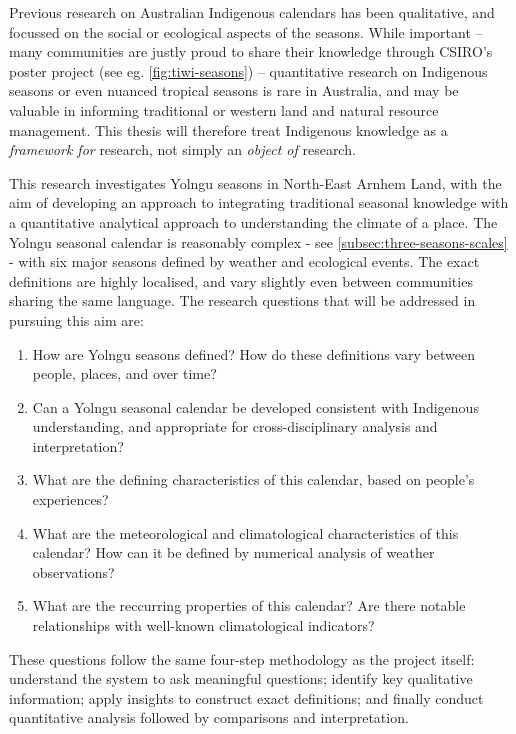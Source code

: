Previous research on Australian Indigenous calendars \citep[eg.][]{%
CSIROcals,BOM-iwk,clarke2009,davis1989,atlas2014}
has been qualitative, and focussed on the social or ecological aspects of
the seasons.  While important -- many communities are justly proud to share
their knowledge through CSIRO's poster project (see eg. \cref{fig:tiwi-seasons})
-- quantitative research on Indigenous seasons or even nuanced tropical seasons
is rare in Australia, and may be valuable in informing traditional or western
land and natural resource management.  This thesis will therefore treat
Indigenous knowledge as a \emph{framework for} research, not simply an
\emph{object of} research.


This research investigates Yolngu seasons in North-East Arnhem Land, with the
aim of developing an approach to integrating traditional seasonal knowledge
with a quantitative analytical approach to understanding the climate of a
place.  The Yolngu seasonal calendar is reasonably complex - see
\cref{subsec:three-seasons-scales} - with six major seasons defined by
weather and ecological events.  The exact definitions are highly localised,
and vary slightly even between communities sharing the same language.
%
The research questions that will be addressed in pursuing this aim are:
\begin{enumerate}
\item How are Yolngu seasons defined?  How do these definitions vary between
    people, places, and over time?
\item Can a Yolngu seasonal calendar be developed consistent with Indigenous
    understanding, and appropriate for cross-disciplinary analysis and interpretation?
\item What are the defining characteristics of this calendar, based on
    people's experiences?
\item What are the meteorological and climatological characteristics of this
    calendar?  How can it be defined by numerical analysis of weather observations?
\item What are the reccurring properties of this calendar?  Are there notable
    relationships with well-known climatological indicators?
\end{enumerate}

These questions follow the same four-step methodology as the project itself:
understand the system to ask meaningful questions; identify key
qualitative information; apply insights to construct exact definitions; and
finally conduct quantitative analysis followed by comparisons and interpretation.

